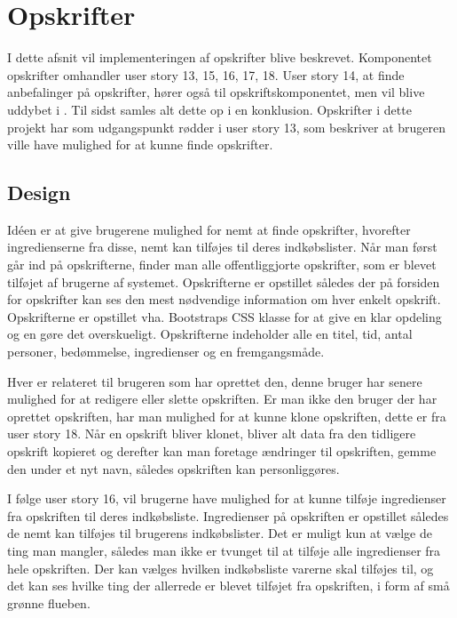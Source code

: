 \section{Opskrifter}
I dette afsnit vil implementeringen af opskrifter blive beskrevet. Komponentet opskrifter omhandler user story 13, 15, 16, 17, 18.
User story 14, at finde anbefalinger på opskrifter, hører også til opskriftskomponentet, men vil blive uddybet i . Til sidst samles alt dette op i en konklusion. 
Opskrifter i dette projekt har som udgangspunkt rødder i user story 13, som beskriver at brugeren ville have mulighed for at kunne finde opskrifter.

\subsection{Design}
Idéen er at give brugerene mulighed for nemt at finde opskrifter, hvorefter ingredienserne fra disse, nemt kan tilføjes til deres indkøbslister.
Når man først går ind på opskrifterne, finder man alle offentliggjorte opskrifter, som er blevet tilføjet af brugerne af systemet.
Opskrifterne er opstillet således der på forsiden for opskrifter kan ses den mest nødvendige information om hver enkelt opskrift.
Opskrifterne er opstillet vha. Bootstraps CSS klasse  for at give en klar opdeling og en gøre det overskueligt.
Opskrifterne indeholder alle en titel, tid, antal personer, bedømmelse, ingredienser og en fremgangsmåde.

Hver  er relateret til brugeren som har oprettet den, denne bruger har senere mulighed for at redigere eller slette opskriften.
Er man ikke den bruger der har oprettet opskriften, har man mulighed for at kunne klone opskriften, dette er fra user story 18.
Når en opskrift bliver klonet, bliver alt data fra den tidligere opskrift kopieret og derefter kan man foretage ændringer til opskriften, gemme den under et nyt navn, således opskriften kan personliggøres.

I følge user story 16, vil brugerne have mulighed for at kunne tilføje ingredienser fra opskriften til deres indkøbsliste.
Ingredienser på opskriften er opstillet således de nemt kan tilføjes til brugerens indkøbslister.
Det er muligt kun at vælge de ting man mangler, således man ikke er tvunget til at tilføje alle ingredienser fra hele opskriften.
Der kan vælges hvilken indkøbsliste varerne skal tilføjes til, og det kan ses hvilke ting der allerrede er blevet tilføjet fra opskriften, i form af små grønne flueben.

